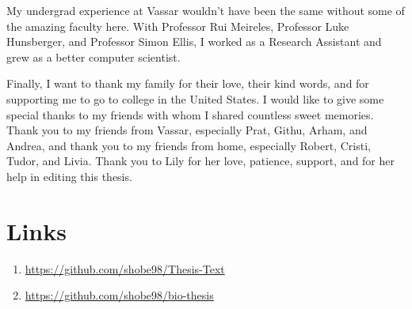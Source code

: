 \documentclass[12pt]{article}
\begin{document}
My undergrad experience at Vassar wouldn't have been the same without some of the amazing faculty here. With Professor Rui Meireles, Professor Luke Hunsberger, and Professor Simon Ellis, I worked as a Research Assistant and grew as a better computer scientist. 

Finally, I want to thank my family for their love, their kind words, and for supporting me to go to college in the United States. I would like to give some special thanks to my friends with whom I shared countless sweet memories. Thank you to my friends from Vassar, especially Prat, Githu, Arham, and Andrea, and thank you to my friends from home, especially Robert, Cristi, Tudor, and Livia.  Thank you to Lily for her love, patience, support, and for her help in editing this thesis.  


\section*{Links}
\begin{enumerate}
    \item  \url{https://github.com/shobe98/Thesis-Text}
\item \url{https://github.com/shobe98/bio-thesis}

\end{enumerate}




\printglossary[type=\acronymtype,title=Abbreviations]





\end{document}
